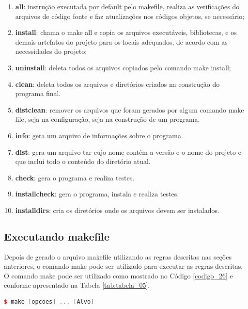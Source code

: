 \begin{enumerate}
    \item \textbf{all}: instrução executada por default pelo makefile, 
realiza as verificações do arquivos de código fonte e faz atualizações
 nos códigos objetos, se necessário;
    \item \textbf{install}: chama o make all e copia os arquivos 
executáveis, bibliotecas, e os demais artefatos do projeto para os 
locais adequados, de acordo com as necessidades do projeto;
    \item \textbf{uninstall}: deleta todos os arquivos copiados 
pelo comando make install;
    \item \textbf{clean}: deleta todos os arquivos e diretórios 
criados na construção do programa final.
    \item \textbf{distclean}: remover os arquivos que foram gerados
 por algum comando make file, seja na configuração, seja na
 construção de um programa.
    \item \textbf{info}: gera um arquivo de informações sobre o programa.
    \item \textbf{dist}: gera um arquivo tar cujo nome contém a versão e
o nome do projeto e  que inclui  todo o conteúdo do diretório atual.
    \item \textbf{check}: gera o programa  e realiza testes. 
    \item \textbf{installcheck}: gera o programa, instala e realiza testes.
    \item \textbf{installdirs}: cria  os diretórios onde os arquivos devem ser instalados.
\end{enumerate}


\subsection{Executando makefile}

Depois de gerado o arquivo makefile utilizando as regras descritas nas seções anteriores,
 o comando make pode ser utilizado para executar as regras descritas.
O comando make pode ser utilizado como mostrado no Código \ref{codigo_26} e conforme apresentado na Tabela \ref{tab:tabela_05}.


    \begin{lstlisting}[language=C++,caption={ 
                                             Utilizando o programa make},
                                                         label=codigo_26]
        $ make [opcoes] ... [Alvo]

    \end{lstlisting}


